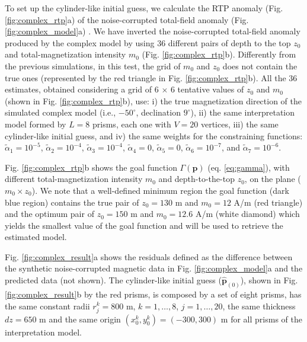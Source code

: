 To set up the cylinder-like initial guess, we calculate the RTP anomaly (Fig. \ref{fig:complex_rtp}a) of the noise-corrupted total-field anomaly 
(Fig. \ref{fig:complex_model}a) .
We have inverted the noise-corrupted total-field anomaly produced by the complex model by using 36 different pairs of depth to the top $ z_0 $ and total-magnetization intensity 
$ m_0 $ (Fig. \ref{fig:complex_rtp}b). 
Differently from the previous simulations, in this test, the grid of $ m_0 $ and $ z_0 $ 
does not contain the true ones (represented by the red triangle in Fig. \ref{fig:complex_rtp}b). 
All the $ 36 $ estimates, obtained considering a grid of 6 $\times$ 6 tentative values of $z_0$ and $m_0$ (shown in Fig. \ref{fig:complex_rtp}b), use: i) the true magnetization direction of the simulated complex model (i.e., $ -50^\circ $, declination $ 9^\circ $), ii) the same interpretation model formed by $ L = 8 $ prisms, each one with $ V = 20 $ vertices, iii) the same cylinder-like initial guess, and iv) the same weights for the constraining functions: 
$\tilde{\alpha}_1 = 10^{-5}$, 
$\tilde{\alpha}_2 = 10^{-4}$, 
$\tilde{\alpha}_3 = 10^{-4}$, 
$\tilde{\alpha}_4 = 0$, 
$\tilde{\alpha}_5 = 0$, 
$\tilde{\alpha}_6 = 10^{-7}$, and 
$\tilde{\alpha}_7 = 10^{-6}$. 

Fig. \ref{fig:complex_rtp}b shows the goal function $ \Gamma(\mathbf{p}) $ (eq. \ref{eq:gamma}), with different total-magnetization intensity $ m_0 $ and depth-to-the-top $z_0$, on the plane ($ m_0 \times z_0 $). 
We note that a well-defined minimum region the goal function (dark blue region) contains the true pair of $z_0 = 130$ m and $m_0 = 12 $ A/m (red triangle) and the optimum pair of 
$z_0 = 150$ m and $m_0 = 12.6 $ A/m (white diamond) which yields the smallest value of the goal function and will be used to retrieve the estimated model.


Fig. \ref{fig:complex_result}a shows the residuals defined as the difference
between the synthetic noise-corrupted magnetic data in Fig. \ref{fig:complex_model}a 
and the predicted data (not shown).
The cylinder-like initial guess ($ \hat{\mathbf{p}}_{(0)} $), shown 
in Fig. \ref{fig:complex_result}b by the red prisms, is composed by a set of eight prisms, has the same constant radii $ r^k_j = 800 $ m, $ k = 1, \dots, 8 $, $ j = 1, \dots, 20 $, 
the same thickness $ dz = 650 $ m and the same origin 
$ (x^k_0, y^k_0) = (-300, 300) $ m for all prisms of the interpretation model.

